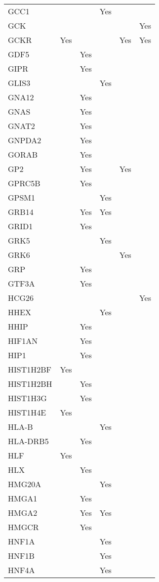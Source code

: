 \documentclass[twoside,openright]{report}
\begin{document}
\begin{appendices}
\begin{longtable}[t]{llllll}
GCC1 &  &  & Yes &  & \\
GCK &  &  &  &  & Yes\\
GCKR & Yes &  &  & Yes & Yes\\
GDF5 &  & Yes &  &  & \\
GIPR &  & Yes &  &  & \\
GLIS3 &  &  & Yes &  & \\
GNA12 &  & Yes &  &  & \\
GNAS &  & Yes &  &  & \\
GNAT2 &  & Yes &  &  & \\
GNPDA2 &  & Yes &  &  & \\
GORAB &  & Yes &  &  & \\
GP2 &  & Yes &  & Yes & \\
GPRC5B &  & Yes &  &  & \\
GPSM1 &  &  & Yes &  & \\
GRB14 &  & Yes & Yes &  & \\
GRID1 &  & Yes &  &  & \\
GRK5 &  &  & Yes &  & \\
GRK6 &  &  &  & Yes & \\
GRP &  & Yes &  &  & \\
GTF3A &  & Yes &  &  & \\
HCG26 &  &  &  &  & Yes\\
HHEX &  &  & Yes &  & \\
HHIP &  & Yes &  &  & \\
HIF1AN &  & Yes &  &  & \\
HIP1 &  & Yes &  &  & \\
HIST1H2BF & Yes &  &  &  & \\
HIST1H2BH &  & Yes &  &  & \\
HIST1H3G &  & Yes &  &  & \\
HIST1H4E & Yes &  &  &  & \\
HLA-B &  &  & Yes &  & \\
HLA-DRB5 &  & Yes &  &  & \\
HLF & Yes &  &  &  & \\
HLX &  & Yes &  &  & \\
HMG20A &  &  & Yes &  & \\
HMGA1 &  & Yes &  &  & \\
HMGA2 &  & Yes & Yes &  & \\
HMGCR &  & Yes &  &  & \\
HNF1A &  &  & Yes &  & \\
HNF1B &  &  & Yes &  & \\
HNF4A &  &  & Yes &  & \\

\end{longtable}
\end{appendices}
\end{document}
